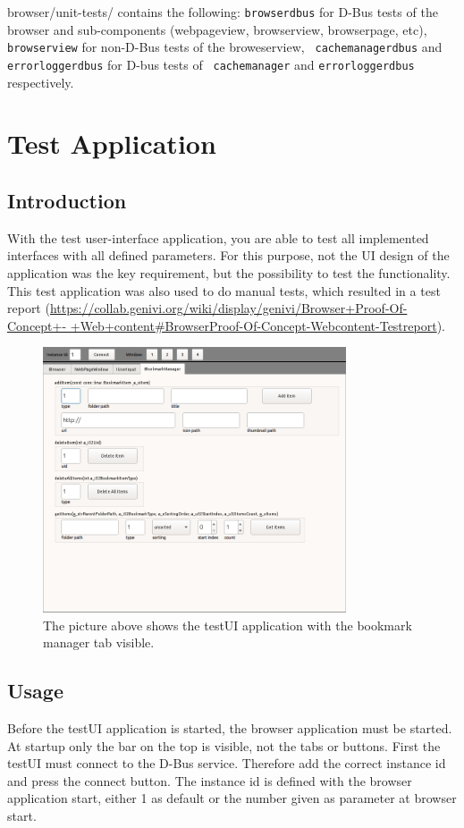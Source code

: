 \documentclass{pelagicore}
\begin{document}
browser/unit-tests/ contains the following: {\tt browserdbus} for D-Bus tests
of the browser and sub-components (webpageview, browserview, browserpage, etc),
{\tt browserview} for non-D-Bus tests of the broweserview, {\tt
cachemanagerdbus} and {\tt errorloggerdbus} for D-bus tests of {\tt
cachemanager} and {\tt errorloggerdbus} respectively.

\section{Test Application}
\subsection{Introduction}
With the test user-interface application, you are able to test all implemented
interfaces with all defined parameters. For this purpose, not the UI design of
the application was the key requirement, but the possibility to test the
functionality. This test application was also used to do manual tests, which
resulted in a test report
(\url{https://collab.genivi.org/wiki/display/genivi/Browser+Proof-Of-Concept+-
+Web+content#BrowserProof-Of-Concept-Webcontent-Testreport}).

\begin{figure}[!ht]
    \center
    \includegraphics[width=0.8\textwidth]{testui.png}
    \caption{The picture above shows the testUI application with the bookmark
             manager tab visible.}
\end{figure}

\subsection{Usage}
Before the testUI application is started, the browser application must be
started. At startup only the bar on the top is visible, not the tabs or
buttons. First the testUI must connect to the D-Bus service. Therefore add the
correct instance id and press the connect button. The instance id is defined
with the browser application start, either 1 as default or the number given as
parameter at browser start.
\end{document}
